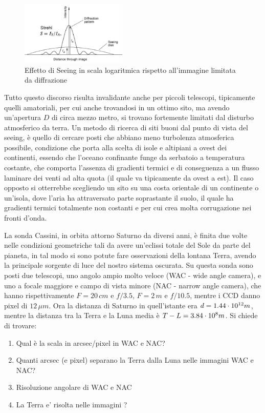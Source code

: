 \begin{figure}[h]
    \centering
    \includegraphics[width=0.45\textwidth]{Immagini/Capitolo2/Seeing_gauss_logscale.PNG}
    \caption{Effetto di Seeing in scala logaritmica rispetto all'immagine limitata da diffrazione}
    \label{im:seeing-logscale}
\end{figure}

Tutto questo discorso risulta invalidante anche per piccoli telescopi, tipicamente quelli amatoriali, per cui anche trovandosi in un ottimo sito, ma avendo un'apertura $D$ di circa mezzo metro, si trovano fortemente limitati dal disturbo atmosferico da terra. Un metodo di ricerca di siti buoni dal punto di vista del seeing, è quello di cercare posti che abbiano meno turbolenza atmosferica possibile, condizione che porta alla scelta di isole e altipiani a ovest dei continenti, essendo che l'oceano confinante funge da serbatoio a temperatura costante, che comporta l'assenza di gradienti termici e di conseguenza a un flusso laminare dei venti ad alta quota (il quale va tipicamente da ovest a est). Il caso opposto si otterrebbe scegliendo un sito su una costa orientale di un continente o un'isola, dove l'aria ha attraversato parte soprastante il suolo, il quale ha gradienti termici totalmente non costanti e per cui crea molta corrugazione nei fronti d'onda.

\begin{exrc}
	La sonda Cassini, in orbita attorno Saturno da diversi anni, è finita due volte nelle condizioni geometriche tali da avere un'eclissi totale del Sole da parte del pianeta, in tal modo si sono potute fare osservazioni della lontana Terra, avendo la principale sorgente di luce del nostro sistema oscurata. Su questa sonda sono posti due telescopi, uno angolo ampio molto veloce (WAC - wide angle camera), e uno a focale maggiore e campo di vista minore (NAC - narrow angle camera), che hanno rispettivamente $F=20\, cm$ e $f/3.5$, $F=2\, m$ e $f/10.5$, mentre i CCD danno pixel di $12\, \mu m$. Ora la distanza di Saturno in quell'istante era $d=1.44\cdot 10^{12}m$, mentre la distanza tra la Terra e la Luna media è $T-L=3.84\cdot 10^{8}m$. Si chiede di trovare:
	\begin{enumerate}
		\item Qual è la scala in arcsec/pixel in WAC e NAC?
		\item Quanti arcsec (e pixel) separano la Terra dalla Luna nelle immagini WAC e NAC?
		\item Risoluzione angolare di WAC e NAC
		\item La Terra e’ risolta nelle immagini ?
	\end{enumerate}
\end{exrc}

